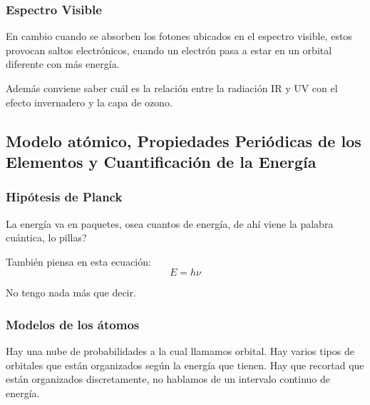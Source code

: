 \documentclass[arial,a4paper,print]{article}
\begin{document}
\subsubsection{Espectro Visible}
En cambio cuando se absorben los fotones ubicados en el espectro visible, estos provocan saltos electrónicos, cuando un electrón pasa a estar en un orbital diferente con más energía.


Además conviene saber cuál es la relación entre la radiación IR y UV con el efecto invernadero y la capa de ozono.  
	
	
\subsection{Modelo atómico, Propiedades Periódicas de los Elementos y Cuantificación de la Energía} 

\subsubsection{Hipótesis de Planck}
La energía va en paquetes, osea cuantos de energía, de ahí viene la palabra cuántica, lo pillas?

También piensa en esta ecuación:
\begin{equation*}
	E = h\nu
\end{equation*}

No tengo nada más que decir.

\subsubsection{Modelos de los átomos}
Hay una nube de probabilidades a la cual llamamos orbital. Hay varios tipos de orbitales que están organizados según la energía que tienen. Hay que recortad que están organizados discretamente, no hablamos de un intervalo continuo de energía. 
\end{document}
